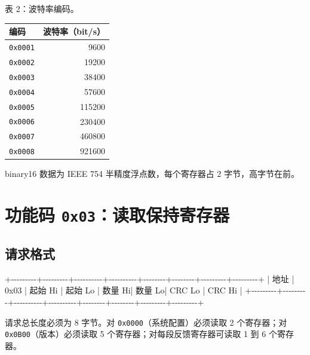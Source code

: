 \documentclass[
  chinese,
]{ctexart}
\newenvironment{Shaded}{}{}
\newcommand{\NormalTok}[1]{#1}
\newcounter{none} %
\begin{document}
表 2：波特率编码。

{\def\LTcaptype{none} %
\begin{longtable}[]{@{}lr@{}}
\toprule\noalign{}
编码 & 波特率（bit/s） \\
\midrule\noalign{}
\endhead
\bottomrule\noalign{}
\endlastfoot
\texttt{0x0001} & 9600 \\
\texttt{0x0002} & 19200 \\
\texttt{0x0003} & 38400 \\
\texttt{0x0004} & 57600 \\
\texttt{0x0005} & 115200 \\
\texttt{0x0006} & 230400 \\
\texttt{0x0007} & 460800 \\
\texttt{0x0008} & 921600 \\
\end{longtable}
}

binary16 数据为 IEEE 754 半精度浮点数，每个寄存器占 2 字节，高字节在前。

\section{\texorpdfstring{功能码
\texttt{0x03}：读取保持寄存器}{功能码 0x03：读取保持寄存器}}\label{ux529fux80fdux7801-0x03ux8bfbux53d6ux4fddux6301ux5bc4ux5b58ux5668}

\subsection{请求格式}\label{ux8bf7ux6c42ux683cux5f0f}

\begin{Shaded}
\begin{Highlighting}[]
\NormalTok{+{-}{-}{-}{-}{-}{-}{-}{-}{-}+{-}{-}{-}{-}{-}{-}{-}{-}{-}+{-}{-}{-}{-}{-}{-}{-}{-}{-}{-}+{-}{-}{-}{-}{-}{-}{-}{-}{-}{-}+{-}{-}{-}{-}{-}{-}{-}{-}+{-}{-}{-}{-}{-}{-}{-}{-}+{-}{-}{-}{-}{-}{-}{-}{-}{-}+{-}{-}{-}{-}{-}{-}{-}{-}{-}+}
\NormalTok{| 地址    | 0x03    | 起始 Hi  | 起始 Lo  | 数量 Hi| 数量 Lo| CRC Lo  | CRC Hi  |}
\NormalTok{+{-}{-}{-}{-}{-}{-}{-}{-}{-}+{-}{-}{-}{-}{-}{-}{-}{-}{-}+{-}{-}{-}{-}{-}{-}{-}{-}{-}{-}+{-}{-}{-}{-}{-}{-}{-}{-}{-}{-}+{-}{-}{-}{-}{-}{-}{-}{-}+{-}{-}{-}{-}{-}{-}{-}{-}+{-}{-}{-}{-}{-}{-}{-}{-}{-}+{-}{-}{-}{-}{-}{-}{-}{-}{-}+}
\end{Highlighting}
\end{Shaded}

请求总长度必须为 8 字节。对 \texttt{0x0000}（系统配置）必须读取 2
个寄存器；对 \texttt{0x0B00}（版本）必须读取 5
个寄存器；对每段反馈寄存器可读取 1 到 6 个寄存器。
\end{document}
